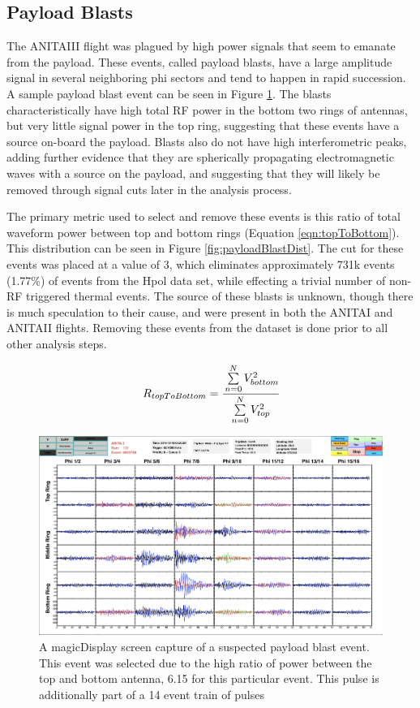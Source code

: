 	\subsection{Payload Blasts}
		The ANITAIII flight was plagued by high power signals that seem to emanate from the payload.  These events, called payload blasts, have a large amplitude signal in several neighboring phi sectors and tend to happen in rapid succession.  A sample payload blast event can be seen in Figure \ref{fig:payloadBlast}.  The blasts characteristically have high total RF power in the bottom two rings of antennas, but very little signal power in the top ring, suggesting that these events have a source on-board the payload.  Blasts also do not have high interferometric peaks, adding further evidence that they are spherically propagating electromagnetic waves with a source on the payload, and suggesting that they will likely be removed through signal cuts later in the analysis process.
		
		The primary metric used to select and remove these events is this ratio of total waveform power between top and bottom rings (Equation \ref{eqn:topToBottom}). This distribution can be seen in Figure \ref{fig:payloadBlastDist}.  The cut for these events was placed at a value of 3, which eliminates approximately 731k  events (1.77\%) of events from the Hpol data set, while effecting a trivial number of non-RF triggered thermal events.  The source of these blasts is unknown, though there is much speculation to their cause, and were present in both the ANITAI and ANITAII flights.  Removing these events from the dataset is done prior to all other analysis steps.  
		
\begin{equation}
	R_{topToBottom} = \cfrac{\sum\limits_{n=0}^{N} V^{2}_{bottom}}{\sum\limits_{n=0}^{N} V^{2}_{top}}
	\label{eqn:topToBottom}
\end{equation}
		
\begin{figure}
	\centering
	\includegraphics[height=0.5\textheight]{figures/payloadBlast}
	\caption{A magicDisplay screen capture of a suspected payload blast event.  This event was selected due to the high ratio of power between the top and bottom antenna, 6.15 for this particular event.  This pulse is additionally part of a 14 event train of pulses}
	\label{fig:payloadBlast}
\end{figure}

